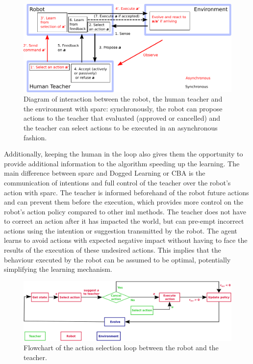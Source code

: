 \begin{figure}[ht]
	\includegraphics[width=1\linewidth]{diagram.pdf}
	\centering
	\caption{Diagram of interaction between the robot, the human teacher and the environment with \gls{sparc}: synchronously, the robot can propose actions to the teacher that evaluated (approved or cancelled) and the teacher can select actions to be executed in an asynchronous fashion.}
	\label{fig:sparc_diagram}
\end{figure}

Additionally, keeping the human in the loop also gives them the opportunity to provide additional information to the algorithm speeding up the learning. The main difference between \gls{sparc} and Dogged Learning or CBA \citep{chernova2009interactive} is the communication of intentions and full control of the teacher over the robot's action with \gls{sparc}. The teacher is informed beforehand of the robot future actions and can prevent them before the execution, which provides more control on the robot's action policy compared to other \gls{iml} methods. The teacher does not have to correct an action after it has impacted the world, but can pre-empt incorrect actions using the intention or suggestion transmitted by the robot. The agent learns to avoid actions with expected negative impact without having to face the results of the execution of these undesired actions. This implies that the behaviour executed by the robot can be assumed to be optimal, potentially simplifying the learning mechanism.

\begin{figure}[ht]
	\includegraphics[width=1\linewidth]{flowchart.pdf}
	\centering
	\caption{Flowchart of the action selection loop between the robot and the teacher.}
	\label{fig:sparc_flowchart}
\end{figure}

